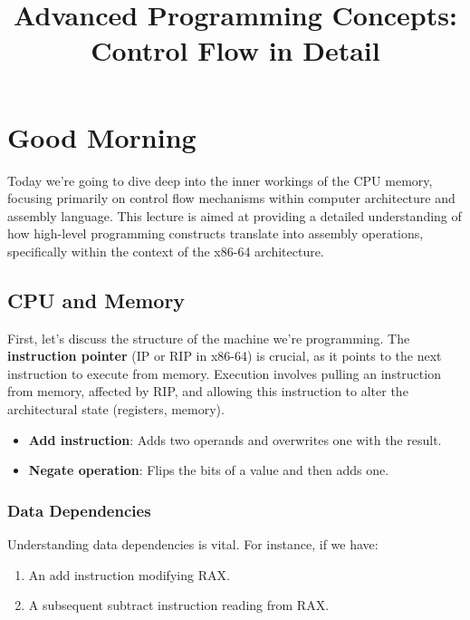 \documentclass{article}
\title{Advanced Programming Concepts: Control Flow in Detail}
\author{}
\date{}
\begin{document}
\maketitle

\tableofcontents

\newpage

\section{Good Morning}

Today we're going to dive deep into the inner workings of the CPU memory, focusing primarily on control flow mechanisms within computer architecture and assembly language. This lecture is aimed at providing a detailed understanding of how high-level programming constructs translate into assembly operations, specifically within the context of the x86-64 architecture.

\subsection{CPU and Memory}

First, let's discuss the structure of the machine we're programming. The \textbf{instruction pointer} (IP or RIP in x86-64) is crucial, as it points to the next instruction to execute from memory. Execution involves pulling an instruction from memory, affected by RIP, and allowing this instruction to alter the architectural state (registers, memory).

\begin{itemize}
    \item \textbf{Add instruction}: Adds two operands and overwrites one with the result.
    \item \textbf{Negate operation}: Flips the bits of a value and then adds one.
\end{itemize}

\subsubsection{Data Dependencies}

Understanding data dependencies is vital. For instance, if we have:

\begin{enumerate}
    \item An add instruction modifying RAX.
    \item A subsequent subtract instruction reading from RAX.
\end{enumerate}
\end{document}
